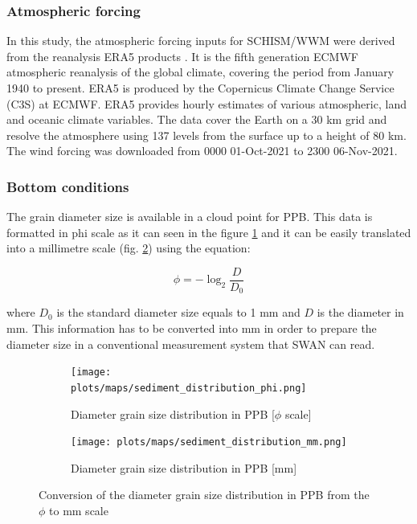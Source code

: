 \documentclass[12pt]{article}
\begin{document}
\subsubsection*{Atmospheric forcing}

In this study, the atmospheric forcing inputs for SCHISM/WWM were derived from the reanalysis ERA5 products \parencite{Hersbach2019}. It is the fifth generation ECMWF atmospheric reanalysis of the global climate, covering the period from January 1940 to present. ERA5 is produced by the Copernicus Climate Change Service (C3S) at ECMWF. ERA5 provides hourly estimates of various atmospheric, land and oceanic climate variables. The data cover the Earth on a 30 km grid and resolve the atmosphere using 137 levels from the surface up to a height of 80 km. The wind forcing was downloaded from 0000 01-Oct-2021 to 2300 06-Nov-2021. 

\subsubsection*{Bottom conditions}

The grain diameter size is available in a cloud point for PPB. This data is formatted in phi scale as it can seen in the figure \ref{fig:diameter_phi} and it can be easily translated into a millimetre scale (fig. \ref{fig:diameter_mm}) using the equation:

\begin{equation}
    \phi = - \log_{2}\frac{D}{D_0}
\end{equation}

where $D_0$ is the standard diameter size equals to 1 mm and $D$ is the diameter in mm. This information has to be converted into mm in order to prepare the diameter size in a conventional measurement system that SWAN can read.

\begin{figure}[h]
\centering
\begin{subfigure}{.5\textwidth}
  \centering
  \texttt{[image: plots/maps/sediment\_distribution\_phi.png]}
  \caption{Diameter grain size distribution in PPB [$\phi$ scale]}
  \label{fig:diameter_phi}
\end{subfigure}%
\begin{subfigure}{.5\textwidth}
  \centering
  \texttt{[image: plots/maps/sediment\_distribution\_mm.png]}
  \caption{Diameter grain size distribution in PPB [mm]}
  \label{fig:diameter_mm}
\end{subfigure}
\caption{Conversion of the diameter grain size distribution in PPB from the $\phi$ to mm scale }
\label{fig:diameter_PPB}
\end{figure}
\end{document}
